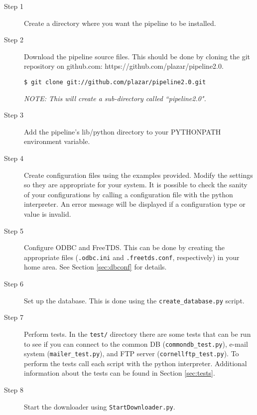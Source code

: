 \documentclass[12pt]{article}
\begin{document}
\begin{description}
    \item[Step 1] Create a directory where you want the pipeline to be installed.

    \item[Step 2] Download the pipeline source files. This should be done by cloning the git repository on github.com: https://github.com/plazar/pipeline2.0.

        \smallskip

        \texttt{\$ git clone git://github.com/plazar/pipeline2.0.git}

        \smallskip
        
        \textit{NOTE: This will create a sub-directory called ``pipeline2.0".} 

    \item[Step 3] Add the pipeline's lib/python directory to your PYTHONPATH environment variable. 

    \item[Step 4] Create configuration files using the examples provided. Modify the settings so they are appropriate for your system. It is possible to check the sanity of your configurations by calling a configuration file with the python interpreter. An error message will be displayed if a configuration type or value is invalid.  

    \item[Step 5] Configure ODBC and FreeTDS. This can be done by creating the appropriate files (\texttt{.odbc.ini} and \texttt{.freetds.conf}, respectively) in your home area. See Section \ref{sec:dbconf} for details.

    \item[Step 6] Set up the database. This is done using the \texttt{create\_database.py} script.

    \item[Step 7] Perform tests. In the \texttt{test/} directory there are some tests that can be run to see if you can connect to the common DB (\texttt{commondb\_test.py}), e-mail system (\texttt{mailer\_test.py}), and FTP server (\texttt{cornellftp\_test.py}). To perform the tests call each script with the python interpreter. Additional information about the tests can be found in Section \ref{sec:tests}.

    \item[Step 8] Start the downloader using \texttt{StartDownloader.py}.
        
        \smallskip
        

\end{description}
\end{document}
